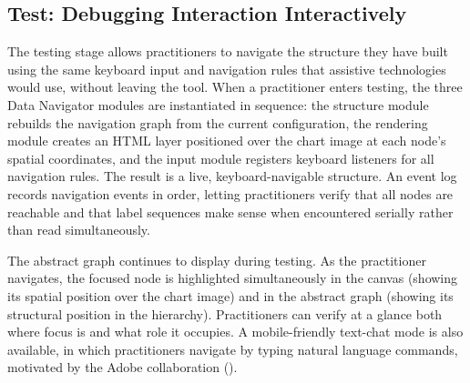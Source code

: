 \documentclass[12pt]{cmuthesis}
\begin{document}
\subsection{Test: Debugging Interaction Interactively}
\label{sec:testing}

The testing stage allows practitioners to navigate the structure they have built using the same keyboard input and navigation rules that assistive technologies would use, without leaving the tool. When a practitioner enters testing, the three Data Navigator modules are instantiated in sequence: the structure module rebuilds the navigation graph from the current configuration, the rendering module creates an HTML layer positioned over the chart image at each node's spatial coordinates, and the input module registers keyboard listeners for all navigation rules. The result is a live, keyboard-navigable structure. An event log records navigation events in order, letting practitioners verify that all nodes are reachable and that label sequences make sense when encountered serially rather than read simultaneously.

The abstract graph continues to display during testing. As the practitioner navigates, the focused node is highlighted simultaneously in the canvas (showing its spatial position over the chart image) and in the abstract graph (showing its structural position in the hierarchy). Practitioners can verify at a glance both where focus is and what role it occupies. A mobile-friendly text-chat mode is also available, in which practitioners navigate by typing natural language commands, motivated by the Adobe collaboration ().


\end{document}
